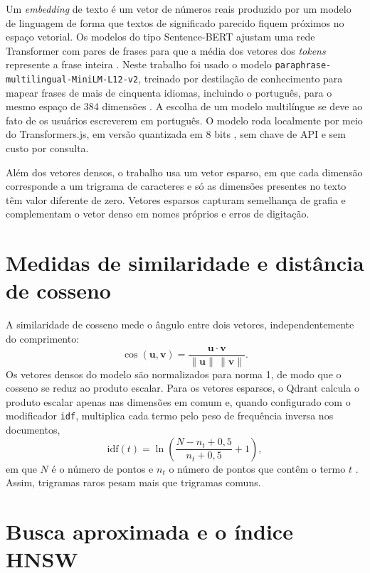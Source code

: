 \documentclass[12pt,oneside,a4paper,english,brazil]{abntex2}
\newcommand{\campo}[1]{\texttt{#1}}
\begin{document}
Um \emph{embedding} de texto é um vetor de números reais produzido por um modelo de linguagem de forma que textos de significado parecido fiquem próximos no espaço vetorial. Os modelos do tipo Sentence-BERT ajustam uma rede Transformer com pares de frases para que a média dos vetores dos \emph{tokens} represente a frase inteira \cite{reimers2019}. Neste trabalho foi usado o modelo \campo{paraphrase-multilingual-MiniLM-L12-v2}, treinado por destilação de conhecimento para mapear frases de mais de cinquenta idiomas, incluindo o português, para o mesmo espaço de 384 dimensões \cite{reimers2020}. A escolha de um modelo multilíngue se deve ao fato de os usuários escreverem em português. O modelo roda localmente por meio do Transformers.js, em versão quantizada em 8 bits \cite{transformersjs}, sem chave de API e sem custo por consulta.

Além dos vetores densos, o trabalho usa um vetor esparso, em que cada dimensão corresponde a um trigrama de caracteres e só as dimensões presentes no texto têm valor diferente de zero. Vetores esparsos capturam semelhança de grafia e complementam o vetor denso em nomes próprios e erros de digitação.

\section{Medidas de similaridade e distância de cosseno}

A similaridade de cosseno mede o ângulo entre dois vetores, independentemente do comprimento:
\begin{equation}
  \cos(\mathbf{u},\mathbf{v}) = \frac{\mathbf{u}\cdot\mathbf{v}}{\lVert\mathbf{u}\rVert\,\lVert\mathbf{v}\rVert}.
\end{equation}
Os vetores densos do modelo são normalizados para norma 1, de modo que o cosseno se reduz ao produto escalar. Para os vetores esparsos, o Qdrant calcula o produto escalar apenas nas dimensões em comum e, quando configurado com o modificador \campo{idf}, multiplica cada termo pelo peso de frequência inversa nos documentos,
\begin{equation}
  \mathrm{idf}(t) = \ln\!\left(\frac{N - n_t + 0{,}5}{n_t + 0{,}5} + 1\right),
\end{equation}
em que $N$ é o número de pontos e $n_t$ o número de pontos que contêm o termo $t$ \cite{qdrantdocs}. Assim, trigramas raros pesam mais que trigramas comuns.

\section{Busca aproximada e o índice HNSW}
\end{document}
